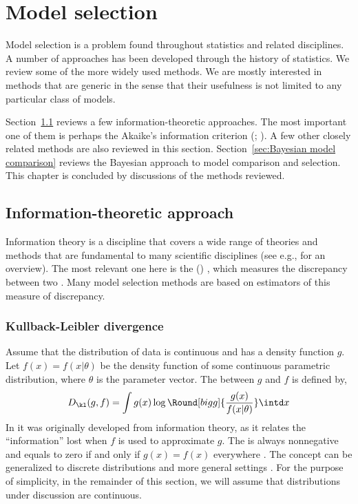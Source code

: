 \chapter{Model selection}
\label{cha:Model selection}

Model selection is a problem found throughout statistics and related disciplines. A number of approaches has been developed through the history of statistics. We review some of the more widely used methods. We are mostly interested in methods that are generic in the sense that their usefulness is not limited to any particular class of models.

Section~\ref{sec:Information theoretic approach} reviews a few information-theoretic approaches. The most important one of them is perhaps the Akaike's information criterion (\aic; \cite{Akaike:1973uc,Akaike:1974ih}). A few other closely related methods are also reviewed in this section. Section~\ref{sec:Bayesian model comparison} reviews the Bayesian approach to model comparison and selection. This chapter is concluded by discussions of the methods reviewed.

\section{Information-theoretic approach}
\label{sec:Information theoretic approach}

Information theory is a discipline that covers a wide range of theories and methods that are fundamental to many scientific disciplines (see e.g., \cite{Cover:1991vx} for an overview). The most relevant one here is the \kldfull (\kld) \cite{Kullback:1951va}, which measures the discrepancy between two . Many model selection methods are based on estimators of this measure of discrepancy.

\subsection{Kullback-Leibler divergence}
\label{sub:Kullback-Liebler divergence}

Assume that the distribution of data is continuous and has a density function $g$. Let $f(x) = f(x|\theta)$ be the density function of some continuous parametric distribution, where $\theta$ is the parameter vector. The \kld between $g$ and $f$ is defined by,
\begin{equation}
  D_{\kl}(g,f) = \int g(x)\log\Round[bigg]{\frac{g(x)}{f(x|\theta)}}\intd x
  \label{eq:kl}
\end{equation}
In \cite{Kullback:1951va} it was originally developed from information theory, as it relates the ``information'' lost when $f$ is used to approximate $g$. The \kld is always nonnegative and equals to zero if and only if $g(x) = f(x)$ everywhere \cite[][sec.~6.8]{Burnham:2002wc}. The concept can be generalized to discrete distributions and more general settings \cite[][sec.~2.1.3]{Burnham:2002wc}. For the purpose of simplicity, in the remainder of this section, we will assume that distributions under discussion are continuous.

